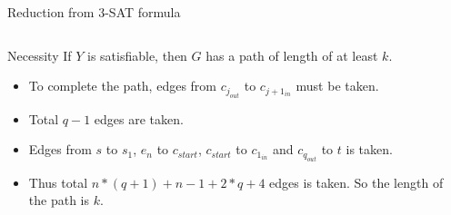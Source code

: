 \begin{frame}{Reduction from 3-SAT formula}
\begin{columns}
\begin{column}{0.45\textwidth}
\begin{block}{Necessity}
If $Y$ is satisfiable, then $G$ has a path of length of at least $k$.
\end{block}

  \begin{itemize} 
    \item<1->
        To complete the path, edges from $c_{j_{out}}$ to $c_{j+1_{in}}$ must be taken.
        \item<2-> Total $q-1$ edges are taken. 
        \item<3-> Edges from $s$ to $s_1$,
        $e_n$ to $c_{start}$, $c_{start}$ to $c_{1_{in}}$ and $c_{q_{out}}$ to $t$ is taken. 
        \item<4->Thus total $n*(q+1) + n-1 + 2*q + 4$ edges is taken. So the length of the path is $k$.
\end{itemize}
\end{column}
\begin{column}{0.55\textwidth}
    \begin{overlayarea}{0.55\textwidth}{8cm}
        \only<1,2>{}
        \only<3>{}
    \end{overlayarea}
\end{column}
\end{columns}
\end{frame}